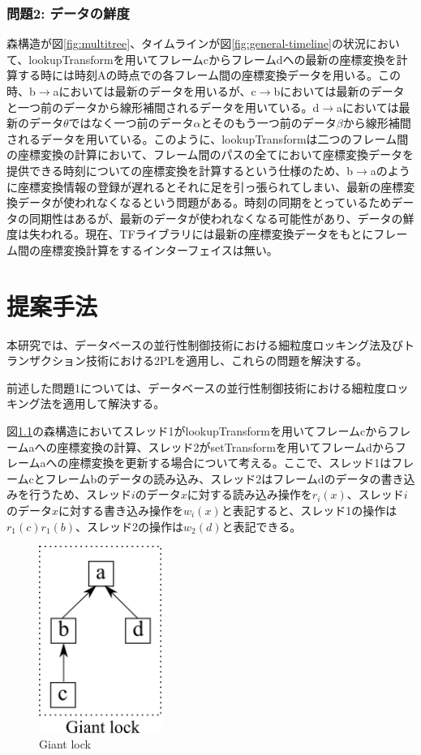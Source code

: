 \documentclass[a4paper]{jreport}	%
\begin{document}
\subsection*{問題2: データの鮮度}
森構造が図\ref{fig:multitree}、タイムラインが図\ref{fig:general-timeline}の状況において、lookupTransformを用いてフレームcからフレームdへの最新の座標変換を計算する時には時刻Aの時点での各フレーム間の座標変換データを用いる。この時、b$\rightarrow$aにおいては最新のデータを用いるが、c$\rightarrow$bにおいては最新のデータと一つ前のデータから線形補間されるデータを用いている。d$\rightarrow$aにおいては最新のデータ$\theta$ではなく一つ前のデータ$\alpha$とそのもう一つ前のデータ$\beta$から線形補間されるデータを用いている。このように、lookupTransformは二つのフレーム間の座標変換の計算において、フレーム間のパスの全てにおいて座標変換データを提供できる時刻についての座標変換を計算するという仕様のため、b$\rightarrow$aのように座標変換情報の登録が遅れるとそれに足を引っ張られてしまい、最新の座標変換データが使われなくなるという問題がある。時刻の同期をとっているためデータの同期性はあるが、最新のデータが使われなくなる可能性があり、データの鮮度は失われる。現在、TFライブラリには最新の座標変換データをもとにフレーム間の座標変換計算をするインターフェイスは無い。

\chapter{提案手法}
本研究では、データベースの並行性制御技術における細粒度ロッキング法及びトランザクション技術における2PLを適用し、これらの問題を解決する。

前述した問題1については、データベースの並行性制御技術における細粒度ロッキング法を適用して解決する。

図\ref{fig:giant-lock}の森構造においてスレッド1がlookupTransformを用いてフレームcからフレームaへの座標変換の計算、スレッド2がsetTransformを用いてフレームdからフレームaへの座標変換を更新する場合について考える。ここで、スレッド1はフレームcとフレームbのデータの読み込み、スレッド2はフレームdのデータの書き込みを行うため、スレッド$i$のデータ$x$に対する読み込み操作を$r_i(x)$、スレッド$i$のデータ$x$に対する書き込み操作を$w_i(x)$と表記すると、スレッド1の操作は$r_1(c)r_1(b)$、スレッド2の操作は$w_2(d)$と表記できる。


\begin{figure}[h] 
\centering
\includegraphics[width=4cm]{gaint-lock}	
\caption{Giant lock}
\label{fig:giant-lock}
\end{figure}
\end{document}

